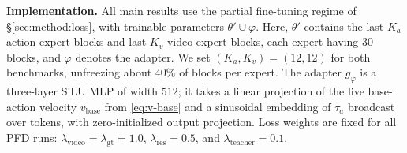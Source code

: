\documentclass{article}
\begin{document}
\noindent\textbf{Implementation.}
All main results use the partial fine-tuning regime of \S\ref{sec:method:loss}, with trainable parameters $\theta'\cup\varphi$. Here, $\theta'$ contains the last $K_a$ action-expert blocks and last $K_v$ video-expert blocks, each expert having $30$ blocks, and $\varphi$ denotes the adapter. We set $(K_a,K_v)=(12,12)$ for both benchmarks, unfreezing about $40\%$ of blocks per expert. The adapter $g_\varphi$ is a three-layer SiLU MLP of width $512$; it takes a linear projection of the live base-action velocity $v_\mathrm{base}$ from \eqref{eq:v-base} and a sinusoidal embedding of $\tau_a$ broadcast over tokens, with zero-initialized output projection. Loss weights are fixed for all PFD runs: $\lambda_\mathrm{video}=\lambda_\mathrm{gt}=1.0$, $\lambda_\mathrm{res}=0.5$, and $\lambda_\mathrm{teacher}=0.1$.





\end{document}
